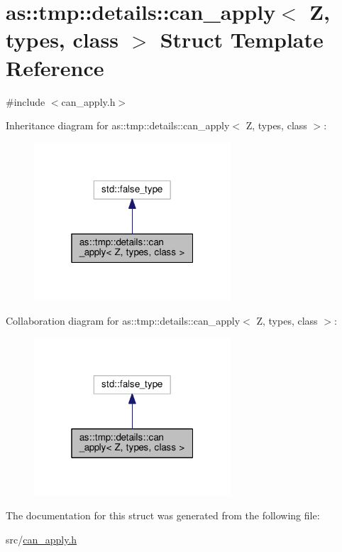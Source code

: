 \hypertarget{structas_1_1tmp_1_1details_1_1can__apply}{}\section{as\+:\+:tmp\+:\+:details\+:\+:can\+\_\+apply$<$ Z, types, class $>$ Struct Template Reference}
\label{structas_1_1tmp_1_1details_1_1can__apply}


{\ttfamily \#include $<$can\+\_\+apply.\+h$>$}



Inheritance diagram for as\+:\+:tmp\+:\+:details\+:\+:can\+\_\+apply$<$ Z, types, class $>$\+:\nopagebreak
\begin{figure}[H]
\begin{center}
\leavevmode
\includegraphics[width=208pt]{structas_1_1tmp_1_1details_1_1can__apply__inherit__graph}
\end{center}
\end{figure}


Collaboration diagram for as\+:\+:tmp\+:\+:details\+:\+:can\+\_\+apply$<$ Z, types, class $>$\+:\nopagebreak
\begin{figure}[H]
\begin{center}
\leavevmode
\includegraphics[width=208pt]{structas_1_1tmp_1_1details_1_1can__apply__coll__graph}
\end{center}
\end{figure}


The documentation for this struct was generated from the following file\+:\begin{DoxyCompactItemize}
\item 
src/\hyperlink{can__apply_8h}{can\+\_\+apply.\+h}\end{DoxyCompactItemize}

